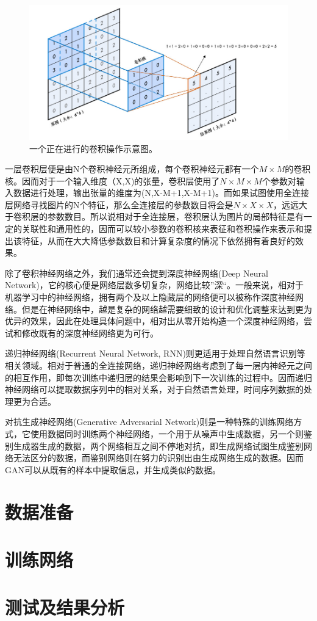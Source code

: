 \begin{figure}
    \centering
    \includegraphics[width=0.7\columnwidth]{pic/con.jpg}
    \caption{一个正在进行的卷积操作示意图\supercite{con}。}
    \label{fig:con}
\end{figure}

一层卷积层便是由N个卷积神经元所组成，每个卷积神经元都有一个$M \times M$的卷积核。因而对于一个输入维度（X,X)的张量，卷积层使用了$N\times M\times M$个参数对输入数据进行处理，输出张量的维度为(N,X-M+1,X-M+1)。而如果试图使用全连接层网络寻找图片的N个特征，那么全连接层的参数数目将会是$N\times X\times X$，远远大于卷积层的参数数目。所以说相对于全连接层，卷积层认为图片的局部特征是有一定的关联性和通用性的，因而可以较小参数的卷积核来表征和卷积操作来表示和提出该特征，从而在大大降低参数数目和计算复杂度的情况下依然拥有着良好的效果。

除了卷积神经网络之外，我们通常还会提到深度神经网络(Deep Neural Network)，它的核心便是网络层数多切复杂，网络比较”深“。一般来说，相对于机器学习中的神经网络，拥有两个及以上隐藏层的网络便可以被称作深度神经网络。但是在神经网络中，越是复杂的网络越需要细致的设计和优化调整来达到更为优异的效果，因此在处理具体问题中，相对出从零开始构造一个深度神经网络，尝试和修改既有的深度神经网络更为可行。

递归神经网络(Recurrent Neural Network, RNN)则更适用于处理自然语言识别等相关领域。相对于普通的全连接网络，递归神经网络考虑到了每一层内神经元之间的相互作用，即每次训练中递归层的结果会影响到下一次训练的过程中。因而递归神经网络可以提取数据序列中的相对关系，对于自然语言处理，时间序列数据的处理更为合适。

对抗生成神经网络(Generative Adversarial Network)则是一种特殊的训练网络方式，它使用数据同时训练两个神经网络，一个用于从噪声中生成数据，另一个则鉴别生成器生成的数据，两个网络相互之间不停地对抗，即生成网络试图生成鉴别网络无法区分的数据，而鉴别网络则在努力的识别出由生成网络生成的数据。因而GAN可以从既有的样本中提取信息，并生成类似的数据。

\section{数据准备}
\label{section:data_prepare}

\section{训练网络}
\label{section:train}

\section{测试及结果分析}
\label{section:cnn_result}

